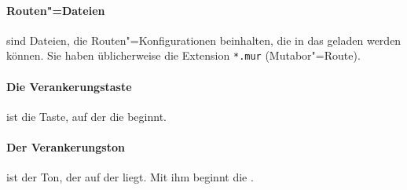 \paragraph{Routen"=Dateien}\label{sec:DV_ROUTESFILE} sind
  Dateien, die Routen"=Konfigurationen beinhalten, die in das
   geladen werden können.  Sie
  haben üblicherweise die Extension \texttt{*.mur} (Mutabor"=Route).

\paragraph{Die Verankerungstaste}\label{sec:DV_BASEKEY} ist die
  Taste, auf der die 
  beginnt.

\paragraph{Der Verankerungston}\label{sec:DV_BASETONE} ist der
  Ton, der auf der  liegt.
  Mit ihm beginnt die .



